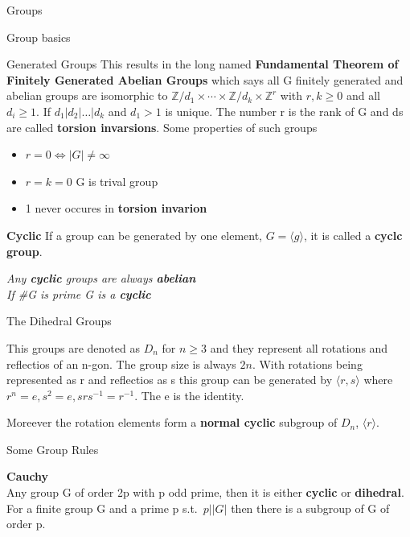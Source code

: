 \documentclass[12pt, letterpaper]{article}
\begin{document}
\begin{section}{Groups}
\begin{subsection}{Group basics}
\begin{subsubsection}{Generated Groups}
      This results in the long named \textbf{Fundamental Theorem of Finitely
        Generated Abelian Groups} which says all G finitely generated and abelian
      groups are isomorphic to \(\mathbb{Z} / d_{1} \times \cdots \times
      \mathbb{Z} / d_{k} \times \mathbb{Z}^{r}\) with \(r, k \geq 0\) and all
      \(d_{i} \geq 1\). If \(d_{1} | d_{2} | \dots | d_{k}\) and \(d_{1} > 1\)
      is unique. The number r is the rank of G and ds are called \textbf{torsion
        invarsions}. Some properties of such groups
      \begin{itemize}
        \item \(r = 0 \iff |G| \neq \infty\)
        \item \(r = k = 0\) G is trival group
        \item 1 never occures in \textbf{torsion invarion}
      \end{itemize}

      \textbf{Cyclic}
      If a group can be generated by one element, \(G = \langle g \rangle\),
      it is called a \textbf{cyclc group}.

      \emph{Any \textbf{cyclic} groups are always \textbf{abelian}} \\
      \emph{If \#G is prime G is a \textbf{cyclic}}

    \end{subsubsection}

    \begin{subsubsection}{The Dihedral Groups}

      This groups are denoted as \(D_{n}\) for \(n \geq 3\) and they represent
      all rotations and reflectios of an n-gon. The group size is always \(2n\).
      With rotations being represented as r and reflectios as s this group can be
      generated by \(\langle r, s \rangle\) where \(r^{n} = e, s^{2} = e, srs^{-1} = r^{-1}\).
      The e is the identity.

      Moreever the rotation elements form a \textbf{normal cyclic} subgroup of \(D_{n}\),
      \(\langle r \rangle\).

    \end{subsubsection}

    \begin{subsubsection}{Some Group Rules}

      \textbf{Cauchy} \\
      Any group G of order 2p with p odd prime, then it is either \textbf{cyclic}
      or \textbf{dihedral}.
      For a finite group G and a prime p s.t.\ \(p | |G|\) then there is a
      subgroup of G of order p. \\


\end{subsubsection}
\end{subsection}
\end{section}
\end{document}

